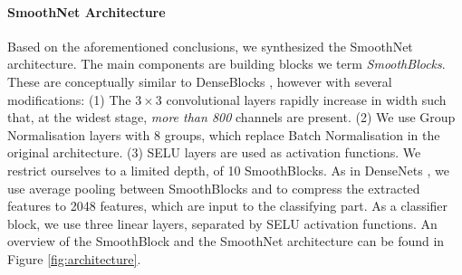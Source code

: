 \documentclass[nohyperref]{article}
\theoremstyle{plain}
\theoremstyle{definition}
\theoremstyle{remark}
\begin{document}
\paragraph{SmoothNet Architecture}
Based on the aforementioned conclusions, we synthesized the SmoothNet architecture. The main components are building blocks we term \textit{SmoothBlocks}. These are conceptually similar to DenseBlocks \cite{huang2017densely}, however with several modifications: (1) The $3\times 3$ convolutional layers rapidly increase in width such that, at the widest stage, \textit{more than 800} channels are present. (2) We use Group Normalisation layers with 8 groups, which replace Batch Normalisation in the original architecture. (3) SELU layers \cite{klambauer2017self} are used as activation functions. We restrict ourselves to a limited depth, of 10 SmoothBlocks. As in DenseNets \cite{huang2017densely}, we use average pooling between SmoothBlocks and to compress the extracted features to 2048 features, which are input to the classifying part. As a classifier block, we use three linear layers, separated by SELU activation functions. An overview of the SmoothBlock and the SmoothNet architecture can be found in Figure \ref{fig:architecture}. 
\end{document}
